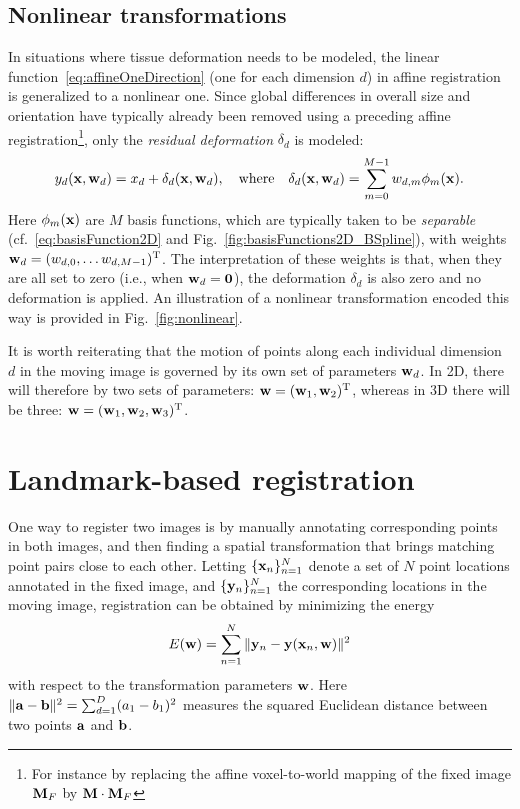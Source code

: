 \documentclass[10pt,twoside]{book}
\begin{document}
\subsection{Nonlinear transformations}

In situations where tissue deformation needs to be modeled, the linear function~\eqref{eq:affineOneDirection} (one for each dimension $d$)
in affine registration
is generalized 
to a nonlinear one.
%
Since global differences in overall size and orientation have typically already been removed using a preceding affine registration\footnote{For instance by replacing the affine voxel-to-world mapping of the fixed image $\mathbf{M}_F$ by $\mathbf{M} \cdot \mathbf{M}_F$}, only the \emph{residual deformation} 
$\delta_d$
is modeled:
\begin{equation}
y_d( \mathbf{x}, \mathbf{w}_d ) = x_d + \delta_d(\mathbf{x}, \mathbf{w}_d),
\quad
\text{where}
\quad
\delta_d(\mathbf{x}, \mathbf{w}_d) =
\sum_{m=0}^{M-1} w_{d,m} \phi_m( \mathbf{x} )
.
\label{eq:deformableOneDirection}
\end{equation}
Here $\phi_m(\mathbf{x})$ are $M$ basis functions, which are typically taken to be \emph{separable} (cf.~\eqref{eq:basisFunction2D} and Fig.~\ref{fig:basisFunctions2D_BSpline}),
with weights $\mathbf{w}_d = (w_{d,0}, \ldots w_{d,M-1})^\mathrm{T}$.
%
The interpretation of these weights is that, when they are all set to zero (i.e., when $\mathbf{w}_d = \mathbf{0}$), the deformation $\delta_d$ is also zero and no deformation is applied.
An illustration of a nonlinear transformation encoded this way is provided in Fig.~\ref{fig:nonlinear}.

%
It is worth reiterating that the motion of points along each individual dimension $d$ in the moving image is governed by its own set of parameters $\mathbf{w}_d$.
%
In 2D, there will therefore by two sets of parameters: $\mathbf{w} = (\mathbf{w}_1, \mathbf{w}_2)^\mathrm{T}$,
whereas in 3D there will be three: $\mathbf{w} = (\mathbf{w}_1, \mathbf{w}_2, \mathbf{w}_3 )^\mathrm{T}$.




\section{Landmark-based registration}

One way to register two images is by manually annotating corresponding points in both images, and then finding a spatial transformation that brings matching point pairs close to each other. Letting $\{\mathbf{x}_n\}_{n=1}^N$ denote a set of $N$ point locations annotated in the fixed image, and $\{\mathbf{y}_n\}_{n=1}^N$ the corresponding locations in the moving image, 
registration can be obtained by minimizing
the energy
$$
E(\mathbf{w}) 
=
\sum_{n=1}^N \| \mathbf{y}_n - \mathbf{y}( \mathbf{x}_n, \mathbf{w} ) \|^2
$$
with respect to the transformation parameters $\mathbf{w}$. 
Here $\| \mathbf{a} - \mathbf{b}\|^2 = \sum_{d=1}^D (a_1-b_1)^ 2$ measures the squared Euclidean distance between two points $\mathbf{a}$ and $\mathbf{b}$.
\end{document}
